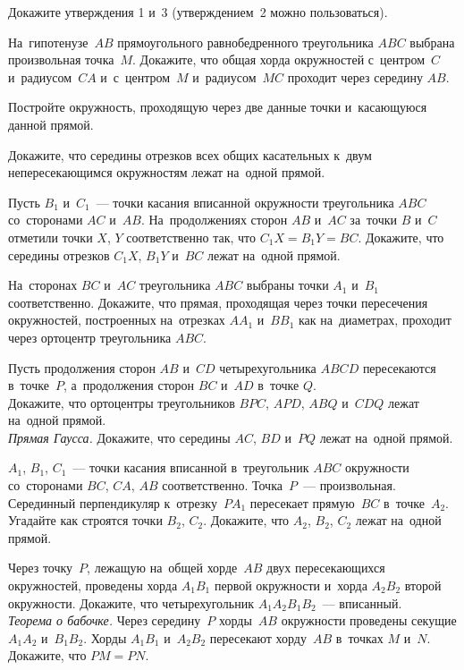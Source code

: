 \begin{problems}

\item
Докажите утверждения 1 и~3 (утверждением~2 можно пользоваться).

\item
На~гипотенузе~$AB$ прямоугольного равнобедренного треугольника $ABC$
выбрана произвольная точка~$M$.
Докажите, что общая хорда окружностей с~центром~$C$ и~радиусом~$CA$
и~с~центром~$M$ и~радиусом~$MC$ проходит через середину $AB$.

\item
Постройте окружность, проходящую через две данные точки и~касающуюся данной
прямой.

\item
Докажите, что середины отрезков всех общих касательных к~двум непересекающимся
окружностям лежат на~одной прямой.

\item
Пусть $B_1$ и~$C_1$~--- точки касания вписанной окружности треугольника $ABC$
со~сторонами $AC$ и~$AB$.
На~продолжениях сторон $AB$ и~$AC$ за~точки $B$ и~$C$ отметили точки $X$, $Y$
соответственно так, что $C_1 X = B_1 Y = BC$.
Докажите, что середины отрезков $C_1 X$, $B_1 Y$ и~$BC$ лежат на~одной прямой.

\item
На~сторонах $BC$ и~$AC$ треугольника $ABC$ выбраны точки $A_1$ и~$B_1$
соответственно.
Докажите, что прямая, проходящая через точки пересечения окружностей,
построенных на~отрезках $A A_1$ и~$B B_1$ как на~диаметрах, проходит через
ортоцентр треугольника $ABC$.

\item
Пусть продолжения сторон $AB$ и~$CD$ четырехугольника $ABCD$ пересекаются
в~точке~$P$, а~продолжения сторон $BC$ и~$AD$ в~точке $Q$.
\\
\sp
Докажите, что ортоцентры треугольников $BPC$, $APD$, $ABQ$ и~$CDQ$ лежат
на~одной прямой.
\\
\sp\emph{Прямая Гаусса.}
Докажите, что середины $AC$, $BD$ и~$PQ$ лежат на~одной прямой.

\item
$A_1$, $B_1$, $C_1$~--- точки касания вписанной в~треугольник $ABC$ окружности
со~сторонами $BC$, $CA$, $AB$ соответственно.
Точка~$P$~--- произвольная.
Серединный перпендикуляр к~отрезку~$P A_1$ пересекает прямую~$BC$
в~точке~$A_2$.
Угадайте как строятся точки $B_2$, $C_2$.
Докажите, что $A_2$, $B_2$, $C_2$ лежат на~одной прямой.

\item
\sp
Через точку~$P$, лежащую на~общей хорде~$AB$ двух пересекающихся окружностей,
проведены хорда $A_1 B_1$ первой окружности и~хорда $A_2 B_2$
второй окружности.
Докажите, что четырехугольник $A_1 A_2 B_1 B_2$~--- вписанный.
\\
\sp\emph{Теорема о бабочке.}
Через середину~$P$ хорды~$AB$ окружности проведены секущие $A_1 A_2$
и~$B_1 B_2$.
Хорды $A_1 B_1$ и~$A_2 B_2$ пересекают хорду~$AB$ в~точках $M$ и~$N$.
Докажите, что $PM = PN$.

\end{problems}


